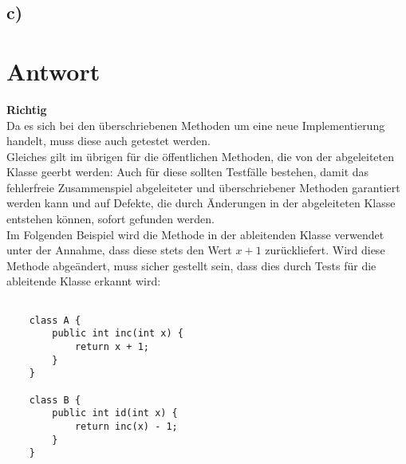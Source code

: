 \subsection*{c)}

\section*{Antwort}

\textbf{Richtig}\\
Da es sich bei den überschriebenen Methoden um eine neue Implementierung handelt, muss diese auch getestet werden.\\

\noindent
Gleiches gilt im übrigen für die öffentlichen Methoden, die von der abgeleiteten Klasse geerbt werden: Auch für diese sollten Testfälle bestehen, damit das fehlerfreie Zusammenspiel abgeleiteter und überschriebener Methoden garantiert werden kann und auf Defekte, die durch Änderungen in der abgeleiteten Klasse entstehen können, sofort gefunden werden.\\
Im Folgenden Beispiel wird die Methode  in der ableitenden Klasse verwendet unter der Annahme, dass diese stets den Wert $x + 1$ zurückliefert.
Wird diese Methode abgeändert, muss sicher gestellt sein, dass dies durch Tests für die ableitende Klasse erkannt wird:

\begin{verbatim}

    class A {
        public int inc(int x) {
            return x + 1;
        }
    }

    class B {
        public int id(int x) {
            return inc(x) - 1;
        }
    }
\end{verbatim}
